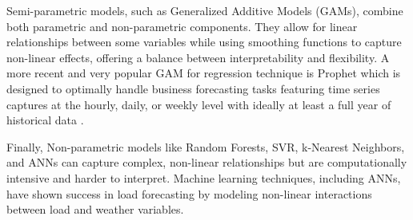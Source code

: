 \documentclass[mstat,12pt]{unswthesis}
\begin{document}
Semi-parametric models, such as Generalized Additive Models (GAMs),
combine both parametric and non-parametric components. They allow for
linear relationships between some variables while using smoothing
functions to capture non-linear effects, offering a balance between
interpretability and flexibility. A more recent and very popular GAM for
regression technique is Prophet which is designed to optimally handle
business forecasting tasks featuring time series captures at the hourly,
daily, or weekly level with ideally at least a full year of historical
data \cite{taylor2017facebook}.

Finally, Non-parametric models like Random Forests, SVR, k-Nearest
Neighbors, and ANNs can capture complex, non-linear relationships but
are computationally intensive and harder to interpret. Machine learning
techniques, including ANNs, have shown success in load forecasting by
modeling non-linear interactions between load and weather variables.
\end{document}
